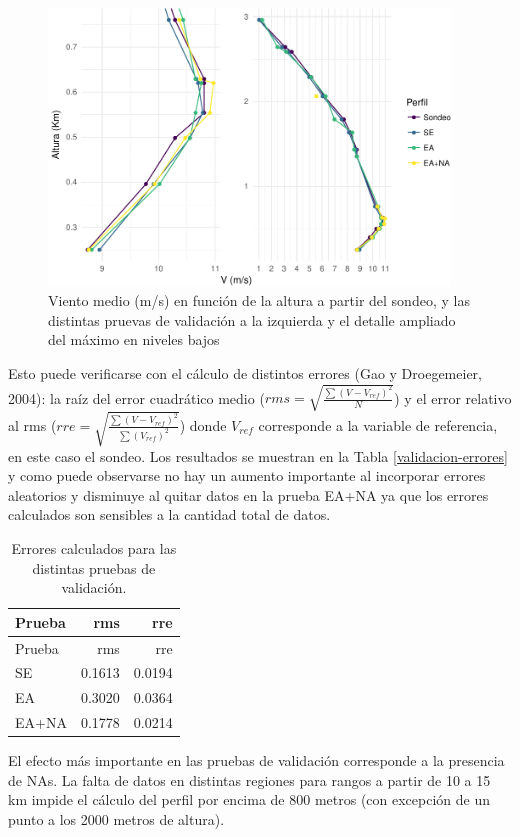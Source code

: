 \documentclass[12pt,spanish,oneside]{book}
\begin{document}
\begin{figure}
\includegraphics[width=0.95\textwidth, ]{Tesis_files/figure-latex/validacion-perfiles-1} \caption{Viento medio (m/s) en función de la altura a partir del sondeo, y las distintas pruevas de validación a la izquierda y el detalle ampliado del máximo en niveles bajos \label{validacion-perfiles}}\label{fig:validacion-perfiles}
\end{figure}

Esto puede verificarse con el cálculo de distintos errores (Gao y
Droegemeier, 2004): la raíz del error cuadrático medio
(\(rms = \sqrt{ \frac{\sum (V-V_{ref})^2}{N} }\)) y el error relativo al
rms (\(rre = \sqrt{ \frac{\sum (V-V_{ref})^2}{\sum (V_{ref})^2} }\))
donde \(V_{ref}\) corresponde a la variable de referencia, en este caso
el sondeo. Los resultados se muestran en la Tabla
\ref{validacion-errores} y como puede observarse no hay un aumento
importante al incorporar errores aleatorios y disminuye al quitar datos
en la prueba EA+NA ya que los errores calculados son sensibles a la
cantidad total de datos.

\begin{longtable}[]{@{}lrr@{}}
\caption{Errores calculados para las distintas pruebas de
validación.}\tabularnewline
\toprule
Prueba & rms & rre\tabularnewline
\midrule
\endfirsthead
\toprule
Prueba & rms & rre\tabularnewline
\midrule
\endhead
SE & 0.1613 & 0.0194\tabularnewline
EA & 0.3020 & 0.0364\tabularnewline
EA+NA & 0.1778 & 0.0214\tabularnewline
\bottomrule
\end{longtable}

El efecto más importante en las pruebas de validación corresponde a la
presencia de NAs. La falta de datos en distintas regiones para rangos a
partir de 10 a 15 km impide el cálculo del perfil por encima de 800
metros (con excepción de un punto a los 2000 metros de altura).
\end{document}
